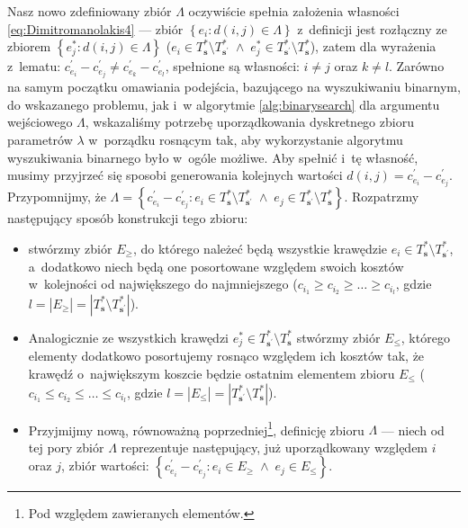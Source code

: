 Nasz nowo zdefiniowany zbiór $\Lambda$ oczywiście spełnia założenia własności \ref{eq:Dimitromanolakis4} --- zbiór $\left\{ e_{i} : d \left( i, j \right) \in \Lambda \right\}$ z~definicji jest rozłączny ze zbiorem $\left\{ e^{\ast}_{j} : d \left( i, j \right) \in \Lambda \right\}$ ($e_{i} \in T^{\ast}_{\textbf{s}} \setminus T^{\ast}_{\textbf{s}^{\prime}} \; \wedge \; e^{\ast}_{j} \in T^{\ast}_{\textbf{s}^{\prime}} \setminus T^{\ast}_{\textbf{s}}$), zatem dla wyrażenia z~lematu: $c^{\prime}_{e_{i}} - c^{\prime}_{e_{j}} \neq c^{\prime}_{e_{k}} - c^{\prime}_{e_{l}}$, spełnione są własności: $i \neq j$ oraz $k \neq l$.
Zarówno na samym początku omawiania podejścia, bazującego na wyszukiwaniu binarnym, do wskazanego problemu, jak i~w algorytmie \ref{alg:binarysearch} dla argumentu wejściowego $\Lambda$, wskazaliśmy potrzebę uporządkowania dyskretnego zbioru parametrów $\lambda$ w~porządku rosnącym tak, aby wykorzystanie algorytmu wyszukiwania binarnego było w~ogóle możliwe.
Aby spełnić i~tę własność, musimy przyjrzeć się sposobi generowania kolejnych wartości $d \left( i, j \right) = c^{\prime}_{e_{i}} - c^{\prime}_{e_{j}}$.
Przypomnijmy, że $\Lambda = \left\{ c^{\prime}_{e_{i}} - c^{\prime}_{e_{j}} : e_{i} \in T^{\ast}_{\textbf{s}} \setminus T^{\ast}_{\textbf{s}^{\prime}} \; \wedge \; e_{j} \in T^{\ast}_{\textbf{s}^{\prime}} \setminus T^{\ast}_{\textbf{s}} \right\}$. 
Rozpatrzmy następujący sposób konstrukcji tego zbioru:

\begin{itemize}
	\item stwórzmy zbiór $E_{\geqslant}$, do którego należeć będą wszystkie krawędzie $e_{i} \in T^{\ast}_{\textbf{s}} \setminus T^{\ast}_{\textbf{s}^{\prime}}$, a~dodatkowo niech będą one posortowane względem swoich kosztów w~kolejności od największego do najmniejszego ($c_{i_{1}} \geqslant c_{i_{2}} \geqslant \dots \geqslant c_{i_{l}}$, gdzie $l = \left| E_{\geqslant} \right| = \left| T^{\ast}_{\textbf{s}} \setminus T^{\ast}_{\textbf{s}^{\prime}} \right|$).
	\item Analogicznie ze wszystkich krawędzi $e^{\ast}_{j} \in T^{\ast}_{\textbf{s}^{\prime}} \setminus  T^{\ast}_{\textbf{s}}$ stwórzmy zbiór $E_{\leqslant}$, którego elementy dodatkowo posortujemy rosnąco względem ich kosztów tak, że krawędź o~największym koszcie będzie ostatnim elementem zbioru $E_{\leqslant}$ ($c_{i_{1}} \leqslant c_{i_{2}} \leqslant \dots \leqslant c_{i_{l}}$, gdzie $l = \left| E_{\leqslant} \right| = \left| T^{\ast}_{\textbf{s}^{\prime}} \setminus  T^{\ast}_{\textbf{s}} \right|$).
	\item Przyjmijmy nową, równoważną poprzedniej\footnote{
		Pod względem zawieranych elementów.
	}, definicję zbioru $\Lambda$ --- niech od tej pory zbiór $\Lambda$ reprezentuje następujący, już uporządkowany względem $i$ oraz $j$, zbiór wartości: $\left\{ c^{\prime}_{e_{i}} - c^{\prime}_{e_{j}} : e_{i} \in E_{\geqslant} \; \wedge \; e_{j} \in E_{\leqslant} \right\}$.
\end{itemize}

